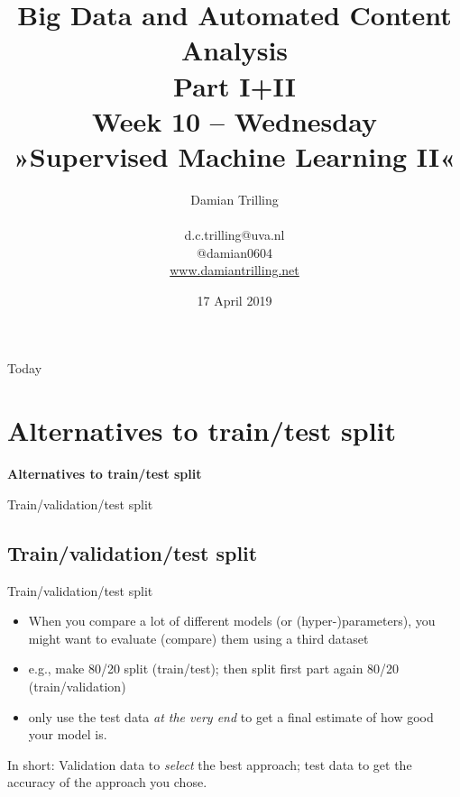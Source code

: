 \documentclass{beamer}
\begin{document}
\title[Big Data and Automated Content Analysis]{\textbf{Big Data and Automated Content Analysis\\ Part I+II} \\ Week 10 -- Wednesday \\ »Supervised Machine Learning II«}
\author[Damian Trilling]{Damian Trilling \\ ~ \\ \footnotesize{d.c.trilling@uva.nl \\@damian0604} \\ \url{www.damiantrilling.net}}
\date{17 April 2019}


\begin{frame}{}
\titlepage
\end{frame}

\begin{frame}{Today}
\tableofcontents
\end{frame}






\section{Alternatives to train/test split}

\begin{frame}[plain]
\textbf{Alternatives to train/test split}

Train/validation/test split 
\end{frame}


\subsection{Train/validation/test split}

\begin{frame}{Train/validation/test split}
\begin{itemize}
	\item When you compare a lot of different models (or (hyper-)parameters), you might want to evaluate (compare) them using a third dataset 
	\item e.g., make 80/20 split (train/test); then split first part again 80/20 (train/validation)
	\item only use the test data \emph{at the very end} to get a final estimate of how good your model is.
\end{itemize}
\pause
In short: Validation data to \emph{select} the best approach; test data to get the accuracy of the approach you chose.
\end{frame}
\end{document}

